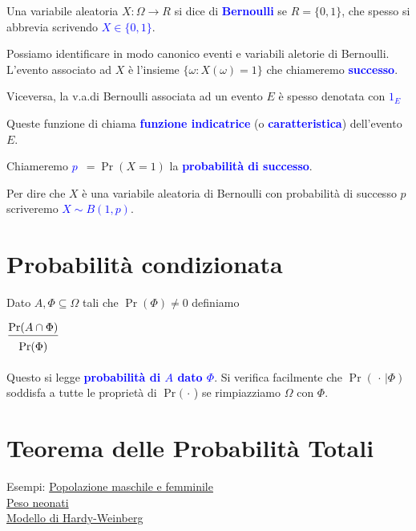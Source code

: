 \documentclass[12pt,openany]{book}
\def\0{\varnothing}
\def\emph#1{\textcolor{blue}{\textbf{\boldmath #1}}}
\theoremstyle{mio}
\theoremstyle{liscio}
\begin{document}
Una variabile aleatoria $X:\Omega\to R$ si dice di \emph{Bernoulli\/} se $R=\{0,1\}$, che spesso si abbrevia scrivendo \emph{$X\in\{0,1\}$}.

Possiamo identificare in modo canonico eventi e variabili aletorie di Bernoulli. L'evento associato ad $X$ è l'insieme $\{\omega:X(\omega)=1\}$ che chiameremo \emph{successo}. 

Viceversa, la v.a.\@ di Bernoulli associata ad un evento $E$ è spesso denotata con \emph{$1_E$}


Queste funzione di chiama \emph{funzione indicatrice\/} (o \emph{caratteristica}) dell'evento $E$. 

Chiameremo \emph{$p$}\ $ = \Pr(X{=}1)$ la \emph{probabilità di successo}.

Per dire che $X$ è una variabile aleatoria di Bernoulli con probabilità di successo $p$ scriveremo \emph{$X\sim B(1,p)$}.



\hfill{}\clearpage\section{Probabilità condizionata}


Dato $A, \Phi\subseteq\Omega$ tali che $\Pr(\Phi)\neq 0$ definiamo 

\ceq{\hfill \emph{$\Pr(A\mathbin|\Phi)$}}{=}$\displaystyle\frac{\Pr(A\cap\Phi)}{\Pr(\Phi)\vphantom{\Big[}}$

Questo si legge \emph{probabilità di $A$ dato $\Phi$}. Si verifica facilmente che $\Pr(\,\cdot\,|\Phi)$ soddisfa a tutte le propriet\`a di $\Pr(\,\cdot\,$) se rimpiazziamo $\Omega$ con $\Phi$.

\hfill{}\clearpage\section{Teorema delle Probabilità Totali}
\label{TeoremaProbabilitaTotali}


{\color{brown}Esempi: \hyperref[MF_totali]{Popolazione maschile e femminile \faShare}
\\
\hphantom{Esempi:} \hyperref[Neonati_totali]{Peso neonati \faShare}
\\
\hphantom{Esempi:} \hyperref[HW_totali1]{Modello di Hardy-Weinberg \faShare}}
\end{document}
